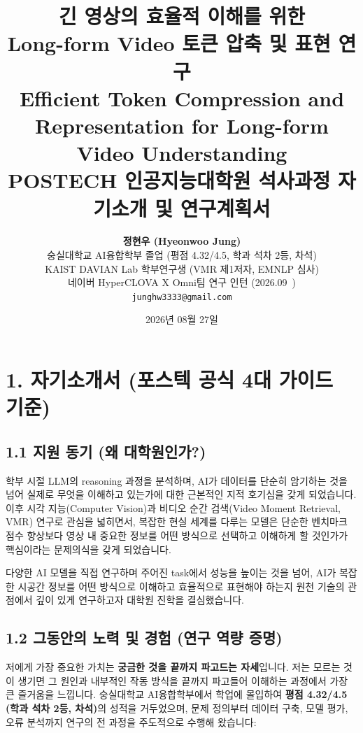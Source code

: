 \documentclass[10pt, a4paper, twocolumn]{article}
\title{\LARGE \textbf{긴 영상의 효율적 이해를 위한\\Long-form Video 토큰 압축 및 표현 연구}\\[0.25em]
\large \textbf{Efficient Token Compression and Representation for Long-form Video Understanding}\\[0.25em]
\normalsize POSTECH 인공지능대학원 석사과정 자기소개 및 연구계획서}
\author{\textbf{정현우 (Hyeonwoo Jung)}\\[0.12em]
숭실대학교 AI융합학부 졸업 (평점 4.32/4.5, 학과 석차 2등, 차석) \\
KAIST DAVIAN Lab 학부연구생 (VMR 제1저자, EMNLP 심사) \\
네이버 HyperCLOVA X Omni팀 연구 인턴 (2026.09~) \\
\texttt{junghw3333@gmail.com}}
\date{2026년 08월 27일}
\begin{document}
\maketitle

\section{1. 자기소개서 (포스텍 공식 4대 가이드 기준)}

\subsection{1.1 지원 동기 (왜 대학원인가?)}
학부 시절 LLM의 reasoning 과정을 분석하며, AI가 데이터를 단순히 암기하는 것을 넘어 실제로 무엇을 이해하고 있는가에 대한 근본적인 지적 호기심을 갖게 되었습니다. 이후 시각 지능(Computer Vision)과 비디오 순간 검색(Video Moment Retrieval, VMR) 연구로 관심을 넓히면서, 복잡한 현실 세계를 다루는 모델은 단순한 벤치마크 점수 향상보다 영상 내 중요한 정보를 어떤 방식으로 선택하고 이해하게 할 것인가가 핵심이라는 문제의식을 갖게 되었습니다.

다양한 AI 모델을 직접 연구하며 주어진 task에서 성능을 높이는 것을 넘어, AI가 복잡한 시공간 정보를 어떤 방식으로 이해하고 효율적으로 표현해야 하는지 원천 기술의 관점에서 깊이 있게 연구하고자 대학원 진학을 결심했습니다.

\subsection{1.2 그동안의 노력 및 경험 (연구 역량 증명)}
저에게 가장 중요한 가치는 \textbf{궁금한 것을 끝까지 파고드는 자세}입니다. 저는 모르는 것이 생기면 그 원인과 내부적인 작동 방식을 끝까지 파고들어 이해하는 과정에서 가장 큰 즐거움을 느낍니다. 숭실대학교 AI융합학부에서 학업에 몰입하여 \textbf{평점 4.32/4.5 (학과 석차 2등, 차석)}의 성적을 거두었으며, 문제 정의부터 데이터 구축, 모델 평가, 오류 분석까지 연구의 전 과정을 주도적으로 수행해 왔습니다:
\end{document}
